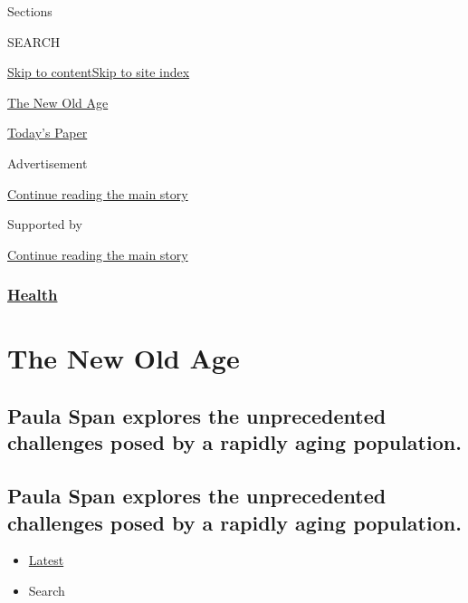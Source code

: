 Sections

SEARCH

\protect\hyperlink{site-content}{Skip to
content}\protect\hyperlink{site-index}{Skip to site index}

\href{https://www.nytimes3xbfgragh.onion/column/the-new-old-age}{The New
Old Age}

\href{https://myaccount.nytimes3xbfgragh.onion/auth/login?response_type=cookie\&client_id=vi}{}

\href{https://www.nytimes3xbfgragh.onion/section/todayspaper}{Today's
Paper}

Advertisement

\protect\hyperlink{after-top}{Continue reading the main story}

Supported by

\protect\hyperlink{after-sponsor}{Continue reading the main story}

\hypertarget{health}{%
\subsubsection{\texorpdfstring{\href{/section/health}{Health}}{Health}}\label{health}}

\hypertarget{the-new-old-age}{%
\section{The New Old Age}\label{the-new-old-age}}

\hypertarget{paula-span-explores-the-unprecedented-challenges-posed-by-a-rapidly-aging-population}{%
\subsection{Paula Span explores the unprecedented challenges posed by a
rapidly aging
population.}\label{paula-span-explores-the-unprecedented-challenges-posed-by-a-rapidly-aging-population}}

\hypertarget{paula-span-explores-the-unprecedented-challenges-posed-by-a-rapidly-aging-population-1}{%
\subsection{Paula Span explores the unprecedented challenges posed by a
rapidly aging
population.}\label{paula-span-explores-the-unprecedented-challenges-posed-by-a-rapidly-aging-population-1}}

\begin{itemize}
\tightlist
\item
  \protect\hyperlink{stream-panel}{Latest}
\item
  Search
\end{itemize}

